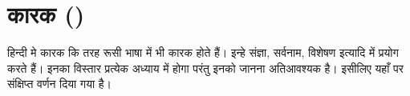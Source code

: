 \chapter{कारक ()}\label{ch:cases}

हिन्दी मे कारक कि तरह रूसी भाषा में भी कारक होते हैं। इन्हे संज्ञा, सर्वनाम, विशेषण इत्यादि में प्रयोग करते हैं। इनका विस्तार प्रत्येक अध्याय में होगा परंतु इनको
जानना अतिआवश्यक है। इसीलिए यहाँ पर संक्षिप्त वर्णन दिया गया है।










